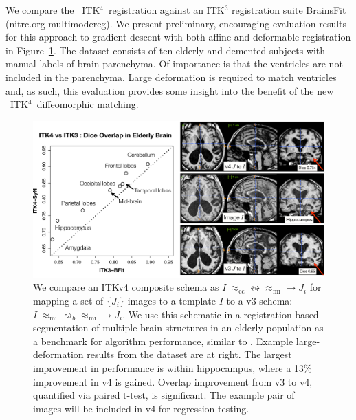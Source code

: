 \documentclass{llncs}
\newcommand{\tk}{~ITK$^{\text{4}}$~}
\begin{document}
We compare the \tk registration against an ITK$^3$ registration suite
BrainsFit (nitrc.org multimodereg).  
We present preliminary, encouraging evaluation results for this approach to
gradient descent with both affine and deformable registration in Figure~\ref{fig:eval}.
The dataset consists of ten elderly and demented subjects with manual labels of brain
parenchyma.  Of importance is that the ventricles are not included in
the parenchyma.  Large deformation is required to match ventricles
and, as such, this evaluation provides some insight into the benefit
of the new \tk diffeomorphic matching.
\begin{figure}[t]
\begin{center}
\includegraphics[width=4.5in]{figs/eval.pdf}
\caption{We compare an ITKv4 composite schema as $I
~\approx_\text{cc}  \leftrightsquigarrow \approx_\text{mi}  \rightarrow
J_i $ for mapping a set of $\{ J_i \}$ images
to a template $I$ to a v3 schema:  $I
~\approx_\text{mi} \rightsquigarrow_b    \approx_\text{mi}  \rightarrow
J_i $.  We use this schematic in a registration-based
segmentation of multiple brain structures in an elderly population as a benchmark
for algorithm performance, similar to \cite{Klein2010}.  Example
large-deformation results from the dataset are at right.  The largest
improvement in performance is within hippocampus, where a 13\%
improvement in v4 is gained.  Overlap improvement from v3 to v4, quantified via
paired t-test, is significant.  The example pair of images will be
included in v4 for regression testing.}
\label{fig:eval}
\end{center}
\end{figure}
\end{document}
